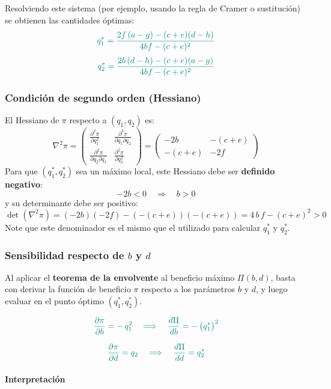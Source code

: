 \documentclass{article}
\begin{document}
Resolviendo este sistema (por ejemplo, usando la regla de Cramer o sustitución) se obtienen las cantidades óptimas:
\[ \color{teal}
q_{1}^{*}
= \frac{2f\,(a - g) - (c+e)(d - h)}
{4bf - (c+e)^2}
\]
\[ \color{teal}
q_{2}^{*}
= \frac{2b\,(d - h) - (c+e)(a - g)}
{4bf - (c+e)^2}
\]

\subsubsection*{Condición de segundo orden (Hessiano)}

El Hessiano de \(\pi\) respecto a \((q_{1},q_{2})\) es:
\[
\nabla^{2}\pi
=
\begin{pmatrix}
\displaystyle \frac{\partial^{2}\pi}{\partial q_{1}^{2}}
& \displaystyle \frac{\partial^{2}\pi}{\partial q_{1}\partial q_{2}} \\[1em]
\displaystyle \frac{\partial^{2}\pi}{\partial q_{2}\partial q_{1}}
& \displaystyle \frac{\partial^{2}\pi}{\partial q_{2}^{2}}
\end{pmatrix}
=
\begin{pmatrix}
-2b & -(c+e) \\[0.5em]
-(c+e) & -2f
\end{pmatrix}
\]
Para que \((q_{1}^{*},q_{2}^{*})\) sea un máximo local, este Hessiano debe ser \textbf{definido negativo}:
\[
-2b < 0
\quad\Longrightarrow\quad
b>0
\]
y su determinante debe ser positivo:
\[
\det(\nabla^{2}\pi)
= (-2b)(-2f) - (-(c+e))(-(c+e))
= 4\,b\,f - (c+e)^{2}
>0
\]
Note que este denominador es el mismo que el utilizado para calcular $q_1^*$ y $q_2^*$.

\subsubsection*{Sensibilidad respecto de \(b\) y \(d\)}

Al aplicar el \textbf{teorema de la envolvente} al beneficio máximo \(\Pi(b,d)\), basta con derivar la función de beneficio \(\pi\) respecto a los parámetros \(b\) y \(d\), y luego evaluar en el punto óptimo \((q_{1}^{*},q_{2}^{*})\).

\[\color{teal}
\frac{\partial\pi}{\partial b}
= -\,q_{1}^{2}
\quad\Longrightarrow\quad
\frac{d\Pi}{db}
= -\,\bigl(q_{1}^{*}\bigr)^{2}
\]

\[\color{teal}
\frac{\partial\pi}{\partial d}
= q_{2}
\quad\Longrightarrow\quad
\frac{d\Pi}{dd}
= q_{2}^{*}
\]

\paragraph{Interpretación}
\end{document}
